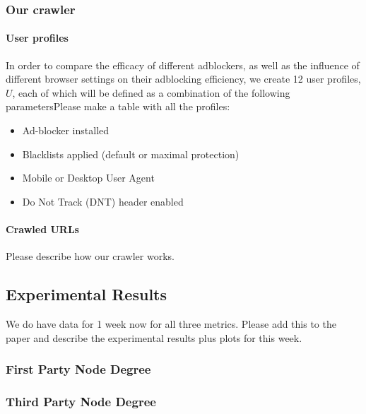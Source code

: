 \documentclass{sig-alternate}
\begin{document}
\subsubsection{Our crawler}
\paragraph{User profiles}
In order to compare the efficacy of different adblockers, as well as the influence of different browser settings on their adblocking efficiency, we create 12 user profiles, $U$, each of which will be defined as a combination of the following parameters{\color{red}Please make a table with all the profiles}:

\begin{itemize}
 \item Ad-blocker installed
 \item Blacklists applied (default or maximal protection)
 \item Mobile or Desktop User Agent
 \item Do Not Track (DNT) header enabled
\end{itemize}

\paragraph{Crawled URLs}

{\color{red}Please describe how our crawler works.}

\subsection{Experimental Results}
{\color{red}We do have data for 1 week now for all three metrics. Please add this to the paper and describe the experimental results plus plots for this week.}
\subsubsection{First Party Node Degree}
\subsubsection{Third Party Node Degree}
\end{document}
